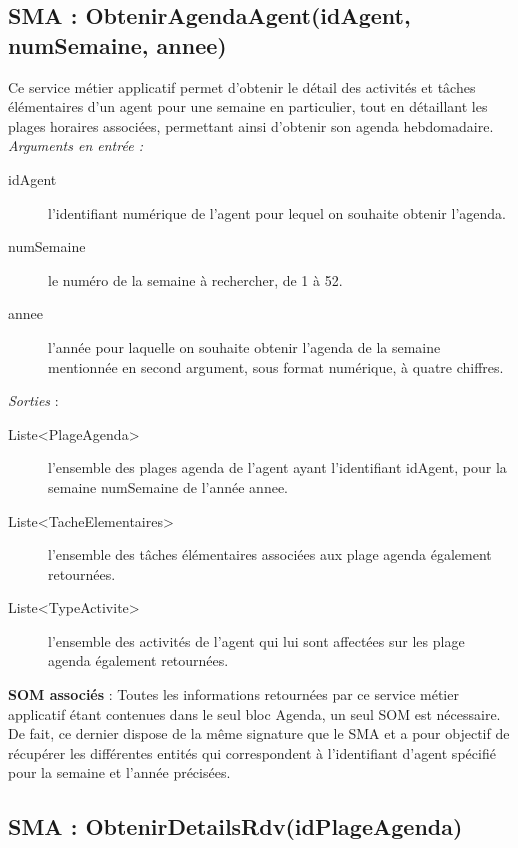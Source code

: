 \subsection{SMA : ObtenirAgendaAgent(idAgent, numSemaine, annee)}
Ce service métier applicatif permet d'obtenir le détail des activités et tâches élémentaires d'un agent pour une semaine en particulier, tout en détaillant les plages horaires associées, permettant ainsi d'obtenir son agenda hebdomadaire. \\

\noindent \textit{\textit{Arguments en entrée :}}
\begin{description}
\item[idAgent] l'identifiant numérique de  l'agent pour lequel on souhaite obtenir l'agenda. 
\item[numSemaine] le numéro de la semaine à rechercher, de 1 à 52. 
\item[annee] l'année pour laquelle on souhaite obtenir l'agenda de la semaine mentionnée en second argument, sous format numérique, à quatre chiffres. \\
\end{description}

\noindent \textit{Sorties} :

\begin{description}
\item[Liste<PlageAgenda>] l'ensemble des plages agenda de l'agent ayant l'identifiant idAgent, pour la semaine numSemaine de l'année annee.
\item[Liste<TacheElementaires>] l'ensemble des tâches élémentaires associées aux plage agenda également retournées. 
\item[Liste<TypeActivite>] l'ensemble des activités de l'agent qui lui sont affectées sur les plage agenda également retournées. \\
\end{description}


\begin{shaded}
\textbf{SOM associés} : Toutes les informations retournées par ce service métier applicatif étant contenues dans le seul bloc Agenda, un seul SOM est nécessaire. De fait, ce dernier dispose de la même signature que le SMA et a pour objectif de récupérer les différentes entités qui correspondent à l'identifiant d'agent spécifié pour la semaine et l'année précisées. 
\end{shaded}

\subsection{SMA : ObtenirDetailsRdv(idPlageAgenda)} 

